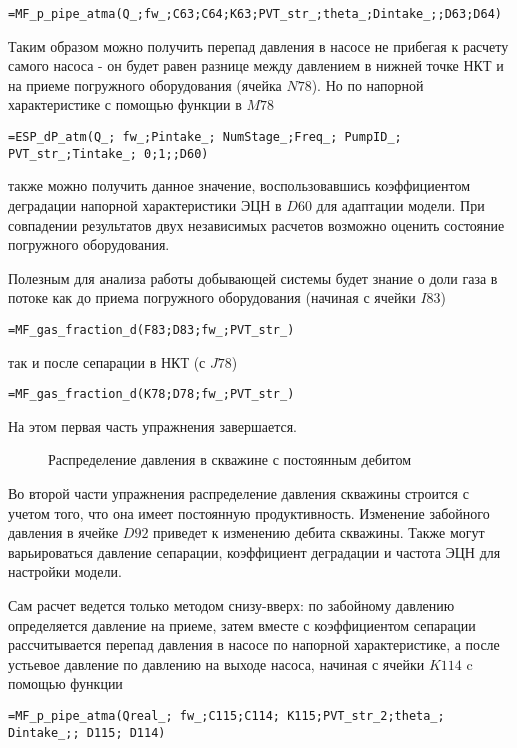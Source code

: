 { \small  \texttt{=MF\_p\_pipe\_atma(Q\_;fw\_;C63;C64;K63;PVT\_str\_;theta\_;Dintake\_;;D63;D64)
}}

Таким образом можно получить перепад давления в насосе не прибегая к расчету самого насоса - он будет равен разнице между давлением в нижней точке НКТ и на приеме погружного оборудования (ячейка $N78$). Но по напорной характеристике с помощью функции в $M78$

{ \small  \texttt{=ESP\_dP\_atm(Q\_; fw\_;Pintake\_; NumStage\_;Freq\_; PumpID\_; PVT\_str\_;Tintake\_; 0;1;;D60)
}}

также можно получить данное значение, воспользовавшись коэффициентом деградации напорной характеристики ЭЦН в $D60$ для адаптации модели. При совпадении результатов двух независимых расчетов возможно оценить состояние погружного оборудования.

Полезным для анализа работы добывающей системы будет знание о доли газа в потоке как до приема погружного оборудования (начиная с ячейки $I83$)

{ \small  \texttt{=MF\_gas\_fraction\_d(F83;D83;fw\_;PVT\_str\_)
}}

так и после сепарации в НКТ (с $J78$)

{ \small  \texttt{=MF\_gas\_fraction\_d(K78;D78;fw\_;PVT\_str\_)
}}

На этом первая часть упражнения завершается.

\begin{figure}[h!]
	\center{\texttt{[image: Ex100\_2]}}
	\caption{Распределение давления в скважине с постоянным дебитом}
	\label{ris:Ex100_2}
\end{figure}

Во второй части упражнения распределение давления скважины строится с учетом того, что она имеет постоянную продуктивность. Изменение забойного давления в ячейке $D92$ приведет к изменению дебита скважины. Также могут варьироваться давление сепарации, коэффициент деградации и частота ЭЦН для настройки модели.

Сам расчет ведется только методом снизу-вверх: по забойному давлению определяется давление на приеме, затем вместе с коэффициентом сепарации рассчитывается перепад давления в насосе по напорной характеристике, а после устьевое давление по давлению на выходе насоса, начиная с ячейки $K114$ c помощью функции

{ \small  \texttt{=MF\_p\_pipe\_atma(Qreal\_; fw\_;C115;C114; K115;PVT\_str\_2;theta\_; Dintake\_;; D115; D114)
}}

